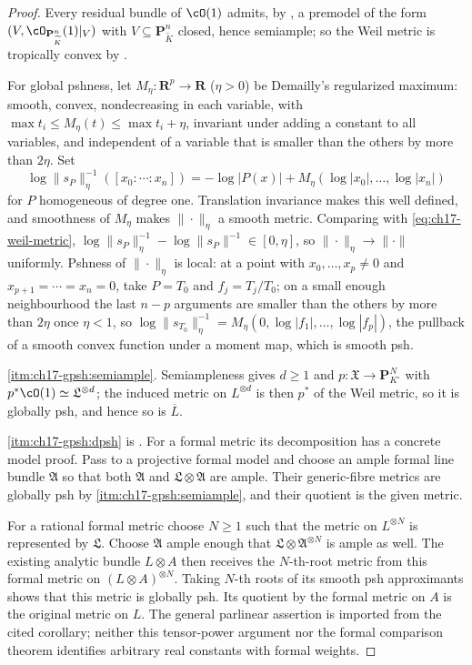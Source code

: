 \begin{proof}
Every residual bundle of $\cO(1)$ admits, by
, a premodel of the form
$(V,\cO_{\mathbf P^n_{\widetilde K}}(1)|_V)$ with
$V\subseteq\mathbf P^n_{\widetilde K}$ closed, hence semiample; so the
Weil metric is tropically convex by
.

For global pshness, let $M_\eta:\mathbf R^{p}\to\mathbf R$
($\eta>0$) be Demailly's regularized maximum: smooth, convex,
nondecreasing in each variable, with
$\max t_i\le M_\eta(t)\le\max t_i+\eta$, invariant under adding a constant
to all variables, and independent of a variable that is smaller than the
others by more than $2\eta$.  Set
\[
 \log\|s_P\|_\eta^{-1}([x_0:\cdots:x_n])
  =-\log|P(x)|+M_\eta(\log|x_0|,\dots,\log|x_n|)
\]
for $P$ homogeneous of degree one.  Translation invariance makes this
well defined, and smoothness of $M_\eta$ makes $\|\cdot\|_\eta$ a smooth
metric.  Comparing with \eqref{eq:ch17-weil-metric},
$\log\|s_P\|_\eta^{-1}-\log\|s_P\|^{-1}\in[0,\eta]$, so
$\|\cdot\|_\eta\to\|\cdot\|$ uniformly.  Pshness of $\|\cdot\|_\eta$ is
local: at a point with $x_0,\dots,x_p\ne0$ and $x_{p+1}=\cdots=x_n=0$,
take $P=T_0$ and $f_j=T_j/T_0$; on a small enough neighbourhood the
last $n-p$ arguments are smaller than the others by more than $2\eta$
once $\eta<1$, so
$\log\|s_{T_0}\|_\eta^{-1}=M_\eta(0,\log|f_1|,\dots,\log|f_p|)$,
the pullback of a smooth convex function under a moment map, which is
smooth psh.

\cref{itm:ch17-gpsh:semiample}.  Semiampleness gives $d\ge1$ and
$p:\mathfrak X\to\mathbf P^N_{K^\circ}$ with
$p^*\cO(1)\simeq\mathfrak L^{\otimes d}$; the induced metric on
$L^{\otimes d}$ is then $p^*$ of the Weil metric, so it is globally psh,
and hence so is $\overline L$.

\cref{itm:ch17-gpsh:dpsh} is \cite[Corollary~17.8.9]{CLD25}.
For a formal metric its decomposition has a concrete model proof.
Pass to a projective formal model and choose an ample formal line bundle
$\mathfrak A$ so that both $\mathfrak A$ and
$\mathfrak L\otimes\mathfrak A$ are ample.  Their generic-fibre
metrics are globally psh by \cref{itm:ch17-gpsh:semiample}, and their
quotient is the given metric.

For a rational formal metric choose $N\ge1$ such that the metric on
$L^{\otimes N}$ is represented by $\mathfrak L$.  Choose
$\mathfrak A$ ample enough that
$\mathfrak L\otimes\mathfrak A^{\otimes N}$ is ample as well.
The existing analytic bundle $L\otimes A$ then receives the $N$-th-root
metric from this formal metric on $(L\otimes A)^{\otimes N}$.
Taking $N$-th roots of its smooth psh approximants shows that this
metric is globally psh.  Its quotient by the formal metric on $A$
is the original metric on $L$.  The general parlinear assertion is
imported from the cited corollary; neither this tensor-power argument
nor the formal comparison theorem identifies arbitrary real constants
with formal weights.
\end{proof}

